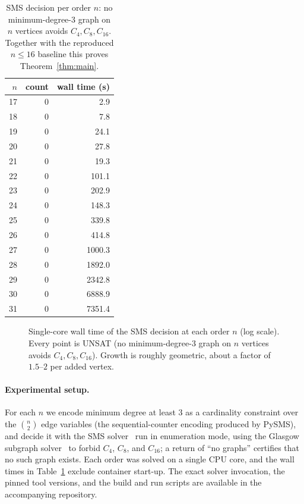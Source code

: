 \documentclass[11pt]{article}
\begin{document}
\begin{table}[h]
\centering
\begin{tabular}{rrr}
\toprule
$n$ & count & wall time (s) \\
\midrule
17 & 0 & 2.9 \\
18 & 0 & 7.8 \\
19 & 0 & 24.1 \\
20 & 0 & 27.8 \\
21 & 0 & 19.3 \\
22 & 0 & 101.1 \\
23 & 0 & 202.9 \\
24 & 0 & 148.3 \\
25 & 0 & 339.8 \\
26 & 0 & 414.8 \\
27 & 0 & 1000.3 \\
28 & 0 & 1892.0 \\
29 & 0 & 2342.8 \\
30 & 0 & 6888.9 \\
31 & 0 & 7351.4 \\
\bottomrule
\end{tabular}
\caption{SMS decision per order $n$: no minimum-degree-3 graph on $n$ vertices
avoids $C_4, C_8, C_{16}$. Together with the reproduced $n\le16$ baseline this
proves Theorem~\ref{thm:main}.}
\label{tab:results}
\end{table}

\begin{figure}[h]
\centering
{}
\caption{Single-core wall time of the SMS decision at each order $n$ (log scale).
Every point is UNSAT (no minimum-degree-3 graph on $n$ vertices avoids
$C_4, C_8, C_{16}$). Growth is roughly geometric, about a factor of $1.5$--$2$ per
added vertex.}
\label{fig:runtime}
\end{figure}

\paragraph{Experimental setup.} For each $n$ we encode minimum degree at least $3$
as a cardinality constraint over the $\binom{n}{2}$ edge variables (the
sequential-counter encoding produced by PySMS), and decide it with the SMS
solver~\cite{sms-tocl} run in enumeration mode, using the Glasgow subgraph
solver~\cite{glasgow} to forbid $C_4$, $C_8$, and $C_{16}$; a return of ``no
graphs'' certifies that no such graph exists. Each order was solved on a single CPU
core, and the wall times in Table~\ref{tab:results} exclude container start-up. The
exact solver invocation, the pinned tool versions, and the build and run scripts
are available in the accompanying repository.
\end{document}
